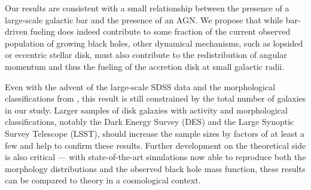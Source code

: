 Our results are consistent with a small relationship between the presence of a large-scale galactic bar and the presence of an AGN. We propose that while bar-driven fueling does indeed contribute to some fraction of the current observed population of growing black holes, other dynamical mechanisms, such as lopsided or eccentric stellar disk, must also contribute to the redistribution of angular momentum and thus the fueling of the accretion disk at small galactic radii. 

Even with the advent of the large-scale SDSS data and the morphological classifications from \gztwo, this result is still constrained by the total number of galaxies in our study. Larger samples of disk galaxies with activity and morphological classifications, notably the Dark Energy Survey (DES) and the Large Synoptic Survey Telescope (LSST), should increase the sample sizes by factors of at least a few and help to confirm these results. Further development on the theoretical side is also critical --- with state-of-the-art simulations now able to reproduce both the morphology distributions and the observed black hole mass function, these results can be compared to theory in a cosmological context.


